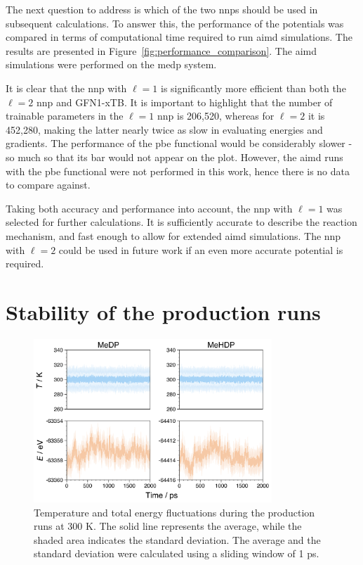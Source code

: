 The next question to address is which of the two \acp{nnp} should be used in subsequent calculations. To answer this, the performance of the potentials was compared in terms of computational time required to run \ac{aimd} simulations. The results are presented in Figure~\ref{fig:performance_comparison}. The \ac{aimd} simulations were performed on the \ac{medp} system.

It is clear that the \ac{nnp} with $\ell=1$ is significantly more efficient than both the $\ell=2$ \ac{nnp} and GFN1-xTB. It is important to highlight that the number of trainable parameters in the $\ell=1$ \ac{nnp} is 206,520, whereas for $\ell=2$ it is 452,280, making the latter nearly twice as slow in evaluating energies and gradients. The performance of the \ac{pbe} functional would be considerably slower - so much so that its bar would not appear on the plot. However, the \ac{aimd} runs with the \ac{pbe} functional were not performed in this work, hence there is no data to compare against.

Taking both accuracy and performance into account, the \ac{nnp} with $\ell=1$ was selected for further calculations. It is sufficiently accurate to describe the reaction mechanism, and fast enough to allow for extended \ac{aimd} simulations. The \ac{nnp} with $\ell=2$ could be used in future work if an even more accurate potential is required.



\section{Stability of the production runs}

\begin{figure}[b!]
    \centering
    \includegraphics[width=0.8\textwidth]{Figures/4_Results/results_aimd_stability.png}
    \caption{Temperature and total energy fluctuations during the production runs at 300 K. The solid line represents the average, while the shaded area indicates the standard deviation. The average and the standard deviation were calculated using a sliding window of 1 ps.}
    \label{fig:temp_energy_fluctuations}
\end{figure}

